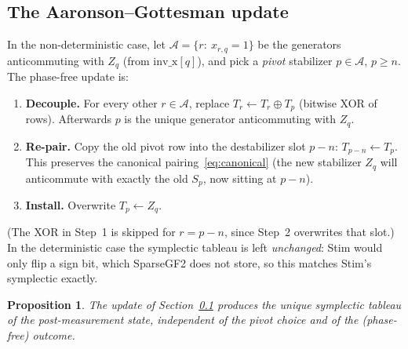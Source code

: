 \documentclass[11pt]{article}
\theoremstyle{definition}
\theoremstyle{plain}
\newtheorem{proposition}[definition]{Proposition}
\newcommand{\code}{\textsf{\small SparseGF2}}
\begin{document}
\subsection{The Aaronson--Gottesman update}
\label{sec:measupdate}
In the non-deterministic case, let $\mathcal{A}=\{r:\ x_{r,q}=1\}$ be the
generators anticommuting with $Z_q$ (from $\mathrm{inv\_x}[q]$), and pick a
\emph{pivot} stabilizer $p\in\mathcal{A}$, $p\ge n$. The phase-free update is:
\begin{enumerate}[leftmargin=2em]
\item \textbf{Decouple.} For every other $r\in\mathcal{A}$, replace
  $T_r \leftarrow T_r \oplus T_p$ (bitwise XOR of rows). Afterwards $p$ is the
  unique generator anticommuting with $Z_q$.
\item \textbf{Re-pair.} Copy the old pivot row into the destabilizer slot
  $p-n$: $T_{p-n}\leftarrow T_p$. This preserves the canonical
  pairing~\eqref{eq:canonical} (the new stabilizer $Z_q$ will anticommute with
  exactly the old $S_p$, now sitting at $p-n$).
\item \textbf{Install.} Overwrite $T_p\leftarrow Z_q$.
\end{enumerate}
(The XOR in Step~1 is skipped for $r=p-n$, since Step~2 overwrites that slot.)
In the deterministic case the symplectic tableau is left \emph{unchanged}: Stim
would only flip a sign bit, which \code{} does not store, so this matches Stim's
symplectic exactly.
\begin{proposition}
The update of Section~\ref{sec:measupdate} produces the unique symplectic
tableau of the post-measurement state, independent of the pivot choice and of
the (phase-free) outcome.
\end{proposition}
\end{document}
